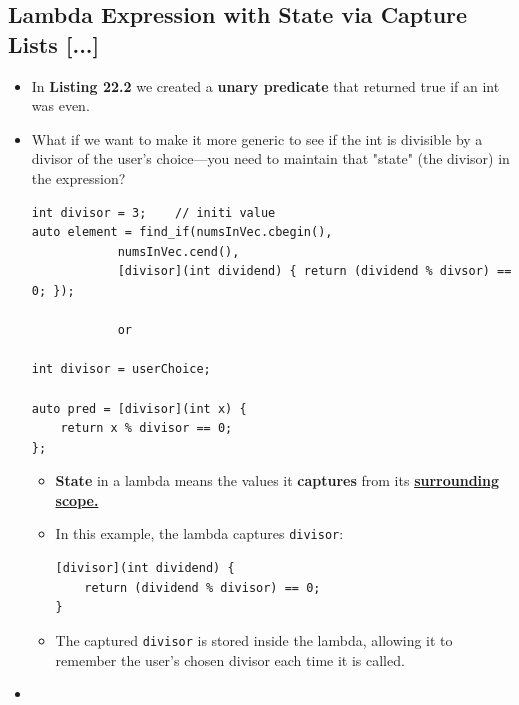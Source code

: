 \documentclass[10pt]{article}
\begin{document}
\subsection{Lambda Expression with State via Capture Lists [...]}
\begin{itemize}
	\item In \textbf{Listing 22.2} we created a \textbf{unary predicate} that returned true if an int was even.

	\item What if we want to make it more generic to see if the int is divisible by a divisor of the user's choice---you need to maintain that "state" (the divisor) in the expression?

		\begin{verbatim}
int divisor = 3;	// initi value
auto element = find_if(numsInVec.cbegin(),
			numsInVec.cend(),
			[divisor](int dividend) { return (dividend % divsor) == 0; });

			or

int divisor = userChoice;

auto pred = [divisor](int x) {
    return x % divisor == 0;
};
		\end{verbatim}

		\begin{itemize}
			\item \textbf{State} in a lambda means the values it \textbf{captures} from its \underline{\textbf{surrounding scope.}}
    \item In this example, the lambda captures \texttt{divisor}:
    \begin{verbatim}
[divisor](int dividend) {
    return (dividend % divisor) == 0;
}
    \end{verbatim}
    \item The captured \texttt{divisor} is stored inside the lambda, allowing it to remember the user's chosen divisor each time it is called.
\end{itemize}

	\item {}

\end{itemize}

\newpage
\end{document}
